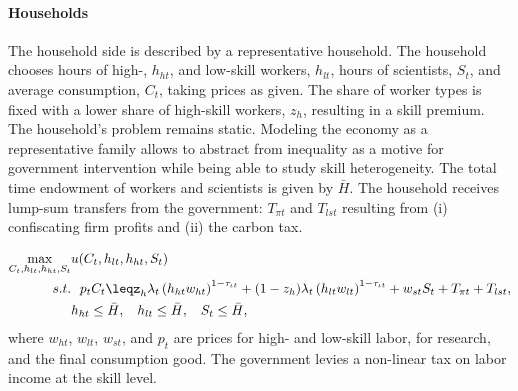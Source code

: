 \paragraph{Households}
The household side is described by a representative household.
The household chooses hours of high-, $h_{ht}$, and low-skill workers, $h_{lt}$, hours of scientists, $S_t$, and average consumption, $C_t$, taking prices as given. The share of worker types is fixed with a lower share of high-skill workers, $z_h$, resulting in a skill premium. The household's problem remains static. Modeling the economy as a representative family allows to abstract from inequality as a motive for government intervention while being able to study skill heterogeneity. The total time endowment of workers and scientists is given by $\bar{H}$. %
The household receives lump-sum transfers from the government: $T_{\pi t}$ and $T_{lst}$ resulting from (i) confiscating firm profits and (ii) the carbon tax.

\begin{align*}
\underset{C_{t}, h_{lt}, h_{ht}, S_t}{\max}&
u(C_{t}, h_{lt}, h_{ht}, S_t)\\
s.t.& \ \ p_{t}C_{t}\leq%
z_h\lambda_t \left(h_{ht}w_{ht}\right)^{1-\tau_{\iota t}}+(1-z_h)\lambda_t\left(h_{lt}w_{lt}\right)^{1-\tau_{\iota t}}+w_{st}S_t+T_{\pi t}+T_{lst},\\
\ & h_{ht}\leq \bar{H},\ \hspace{2mm} h_{lt}\leq \bar{H},\ \hspace{2mm}  S_{t}\leq \bar{H},
\end{align*}
where $w_{ht}$, $w_{lt}$, $w_{st}$, and $p_{t}$ are prices for high- and low-skill labor, for research, and the final consumption good.
The government levies a non-linear tax on labor income at the skill level. 


